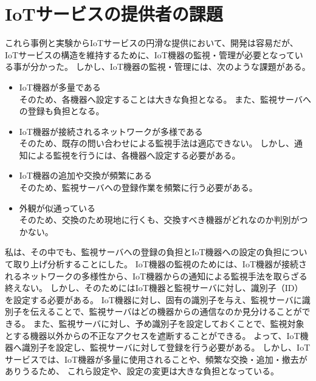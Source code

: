 \section{IoTサービスの提供者の課題}
これら事例と実験からIoTサービスの円滑な提供において、開発は容易だが、IoTサービスの構造を維持するために、IoT機器の監視・管理が必要となっている事が分かった。
しかし、IoT機器の監視・管理には、次のような課題がある。
\begin{itemize}
\item IoT機器が多量である\\
	そのため、各機器へ設定することは大きな負担となる。
	また、監視サーバへの登録も負担となる。
\item IoT機器が接続されるネットワークが多様である\\
	そのため、既存の問い合わせによる監視手法は適応できない。
	しかし、通知による監視を行うには、各機器へ設定する必要がある。
\item IoT機器の追加や交換が頻繁にある\\
	そのため、監視サーバへの登録作業を頻繁に行う必要がある。
\item 外観が似通っている\\
	そのため、交換のため現地に行くも、交換すべき機器がどれなのか判別がつかない。
\end{itemize}


私は、その中でも、監視サーバへの登録の負担とIoT機器への設定の負担について取り上げ分析することにした。
IoT機器の監視のためには、IoT機器が接続されるネットワークの多様性から、IoT機器からの通知による監視手法を取らざる終えない。
しかし、そのためにはIoT機器と監視サーバに対し、識別子（ID）を設定する必要がある。
IoT機器に対し、固有の識別子を与え、監視サーバに識別子を伝えることで、監視サーバはどの機器からの通信なのか見分けることができる。
また、監視サーバに対し、予め識別子を設定しておくことで、監視対象とする機器以外からの不正なアクセスを遮断することができる。
よって、IoT機器へ識別子を設定し、監視サーバに対して登録を行う必要がある。
しかし、IoTサービスでは、IoT機器が多量に使用されることや、頻繁な交換・追加・撤去がありうるため、
これら設定や、設定の変更は大きな負担となっている。


